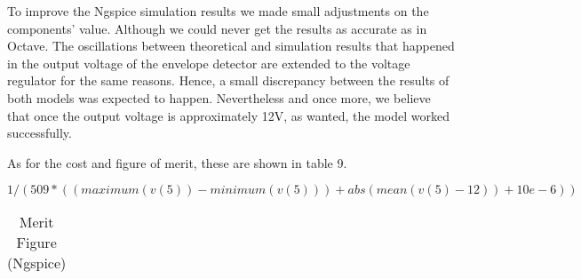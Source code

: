 To improve the Ngspice simulation results we made small adjustments on the components' value. Although we could never get the results as accurate as in Octave. 
The oscillations between theoretical and simulation results that happened in the output voltage of the envelope detector are extended to the voltage regulator for the same reasons. Hence, a small discrepancy between the results of both models was expected to happen. Nevertheless and once more, we believe that once the output voltage is approximately 12V, as wanted, the model worked successfully.

As for the cost and figure of merit, these are shown in table 9.

\begin{equation}
    1/ (509* ((maximum(v(5))-minimum(v(5))) + abs(mean(v(5)-12)) + 10e-6))
\end{equation}

\begin{table}[!h]
\centering
\begin{tabularx}{1\textwidth} {
  | >{\raggedright\arraybackslash}X
  | >{\raggedleft\arraybackslash}X | }
 \hline

\end{tabularx}
\caption{Merit Figure (Ngspice)}
\end{table}

